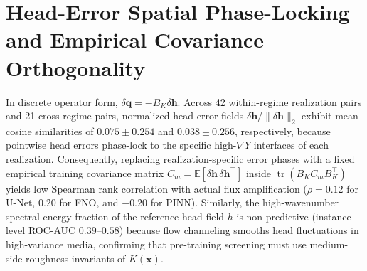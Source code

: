 \documentclass[preprint,12pt,authoryear]{elsarticle}
\begin{document}
\section{Head-Error Spatial Phase-Locking and Empirical Covariance Orthogonality}
\label{sec:s4}

In discrete operator form, $\delta\mathbf{q} = -B_K \delta\mathbf{h}$. Across 42 within-regime realization pairs and 21 cross-regime pairs, normalized head-error fields $\delta\mathbf{h}/\|\delta\mathbf{h}\|_2$ exhibit mean cosine similarities of $0.075 \pm 0.254$ and $0.038 \pm 0.256$, respectively, because pointwise head errors phase-lock to the specific high-$\nabla Y$ interfaces of each realization. Consequently, replacing realization-specific error phases with a fixed empirical training covariance matrix $C_m = \mathbb{E}[\delta\mathbf{h}\,\delta\mathbf{h}^\top]$ inside $\operatorname{tr}(B_K C_m B_K^\top)$ yields low Spearman rank correlation with actual flux amplification ($\rho = 0.12$ for U-Net, $0.20$ for FNO, and $-0.20$ for PINN). Similarly, the high-wavenumber spectral energy fraction of the reference head field $h$ is non-predictive (instance-level ROC-AUC $0.39$--$0.58$) because flow channeling smooths head fluctuations in high-variance media, confirming that pre-training screening must use medium-side roughness invariants of $K(\mathbf{x})$.
\end{document}
